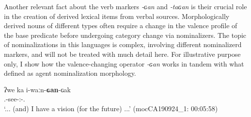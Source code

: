 \documentclass[12pt]{article}
\begin{document}


 
 Another relevant fact about the verb markers \textit{‑ɢan} and \textit{‑taɢan} is their crucial role in the creation of derived lexical items from verbal sources. Morphologically derived nouns of different types often require a change in the valence profile of the base predicate before undergoing category change via nominalizers. The topic of nominalizations in this languages is complex, involving different nominalizerd markers, and will not be treated with much detail here. For illustrative purpose only, I show how the valence-changing operator \textit{-ɢan} works in tandem with what \citet[][150--153]{gualdieri1998} defined as agent nominalization morphology. 
 
    

\begin{exe}
\ex 
\gll ʔwe ka i-waːn-\textbf{ɢan}-ɢak  \\
{\Exist} {\DetOne} {\First\Sg.\Poss}-see-{\Vm:\Intr}-{\Nmlz.\Act}\\
\trans `... (and)  I have a vision (for the future) ...'  \hfill (mocCA190924\_1: 00:05:58) \label{ex:nom-action}
\end{exe}
 
\end{document}
